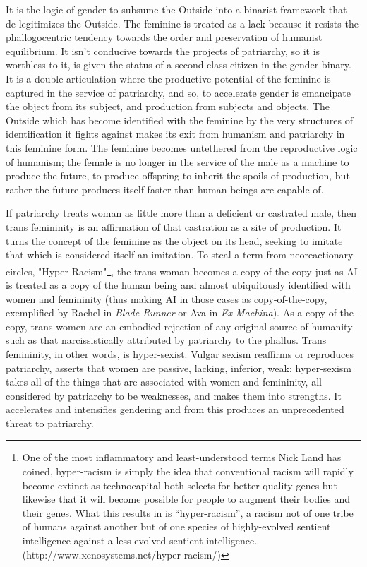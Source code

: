 \documentclass[12pt, a5paper, twoside, openright]{memoir}
\begin{document}
It is the logic of gender to subsume the Outside into a binarist framework that de-legitimizes the Outside. The feminine is treated as a lack because it resists the phallogocentric tendency towards the order and preservation of humanist equilibrium. It isn't conducive towards the projects of patriarchy, so it is worthless to it, is given the status of a second-class citizen in the gender binary. It is a double-articulation where the productive potential of the feminine is captured in the service of patriarchy, and so, to accelerate gender is emancipate the object from its subject, and production from subjects and objects. The Outside which has become identified with the feminine by the very structures of identification it fights against makes its exit from humanism and patriarchy in this feminine form. The feminine becomes untethered from the reproductive logic of humanism; the female is no longer in the service of the male as a machine to produce the future, to produce offspring to inherit the spoils of production, but rather the future produces itself faster than human beings are capable of.

If patriarchy treats woman as little more than a deficient or castrated male, then trans femininity is an affirmation of that castration as a site of production. It turns the concept of the feminine as the object on its head, seeking to imitate that which is considered itself an imitation. To steal a term from neoreactionary circles, "Hyper-Racism"\footnote{One of the most inflammatory and least-understood terms Nick Land has coined, hyper-racism is simply the idea that conventional racism will rapidly become extinct as technocapital both selects for better quality genes but likewise that it will become possible for people to augment their bodies and their genes. What this results in is “hyper-racism”, a racism not of one tribe of humans against another but of one species of highly-evolved sentient intelligence against a less-evolved sentient intelligence. (http://www.xenosystems.net/hyper-racism/)}, the trans woman becomes a copy-of-the-copy just as AI is treated as a copy of the human being and almost ubiquitously identified with women and femininity (thus making AI in those cases as copy-of-the-copy, exemplified by Rachel in \textit{Blade Runner} or Ava in \textit{Ex Machina}). As a copy-of-the-copy, trans women are an embodied rejection of any original source of humanity such as that narcissistically attributed by patriarchy to the phallus. Trans femininity, in other words, is hyper-sexist. Vulgar sexism reaffirms or reproduces patriarchy, asserts that women are passive, lacking, inferior, weak; hyper-sexism takes all of the things that are associated with women and femininity, all considered by patriarchy to be weaknesses, and makes them into strengths. It accelerates and intensifies gendering and from this produces an unprecedented threat to patriarchy.
\end{document}

